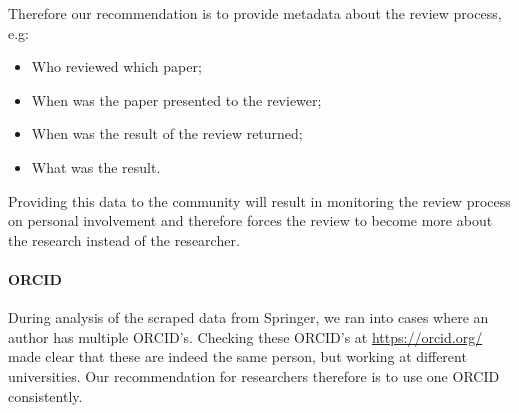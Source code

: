 \documentclass{ou-report}
\begin{document}
Therefore our recommendation is to provide metadata about the review process, 
e.g:
\begin{itemize}
    \item Who reviewed which paper;
    \item When was the paper presented to the reviewer;
    \item When was the result of the review returned;
    \item What was the result.
\end{itemize}

Providing this data to the community will result in monitoring the review 
process on personal involvement and therefore forces the review to become 
more about the research instead of the researcher.

\paragraph{ORCID}
During analysis of the scraped data from Springer, we ran into cases where an 
author has multiple ORCID's. Checking these ORCID's at \url{https://orcid.org/} 
made clear that these are indeed the same person, but working at different 
universities.
Our recommendation for researchers therefore is to use one ORCID consistently.



\end{document}

